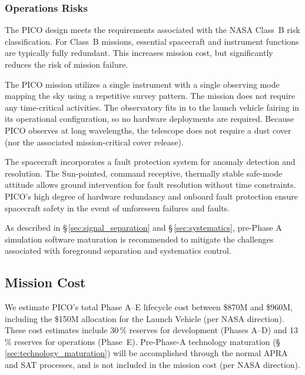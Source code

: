 \subsubsection{Operations Risks}
\label{sec:operations_risks} %

The PICO design meets the requirements associated with the NASA
Class~B risk classification. For Class~B missions, essential
spacecraft and instrument functions are typically fully
redundant. This increases mission cost, but significantly reduces the
risk of mission failure.

The PICO mission utilizes a single instrument with a single observing
mode mapping the sky using a repetitive survey pattern. The mission
does not require any time-critical activities. The observatory fits in
to the launch vehicle fairing in its operational configuration, so no
hardware deployments are required. Because PICO observes at long
wavelengths, the telescope does not require a dust cover (nor the
associated mission-critical cover release).

The spacecraft incorporates a fault protection system for anomaly
detection and resolution. The Sun-pointed, command receptive,
thermally stable safe-mode attitude allows ground intervention for
fault resolution without time constraints. PICO's high degree of
hardware redundancy and onboard fault protection ensure spacecraft
safety in the event of unforeseen failures and faults.

As described in \S\,\ref{sec:signal_separation} and
\S\,\ref{sec:systematics}, pre-Phase A simulation software maturation
is recommended to mitigate the challenges associated with foreground
separation and systematics control.


\subsection{Mission Cost}
\label{sec:mission_cost} %
%
%

We estimate PICO's total Phase A--E lifecycle cost between \$870M and
\$960M, including the \$150M allocation for the Launch Vehicle (per
NASA direction). These cost estimates include 30\,\% reserves for
development (Phases A--D) and 13\,\% reserves for operations
(Phase~E). Pre-Phase-A technology maturation
(\S\,\ref{sec:technology_maturation}) will be accomplished through the
normal APRA and SAT processes, and is not included in the mission cost
(per NASA direction).

